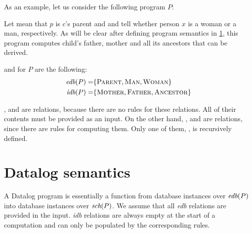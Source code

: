 \begin{exmp}
As an example, let us consider the following program $P$:


Let  mean that $p$ is $c$'s parent and  and  tell whether person $x$ is a woman or a man, respectively. As will be clear after defining program semantics in \ref{ss:datalogsemantics}, this program computes child's father, mother and all its ancestors that can be derived.

\edb and \idb for $P$ are the following:
\begin{align*}
\textit{edb}(P) =& \{\textsc{Parent}, \textsc{Man}, \textsc{Woman}\} \\
\textit{idb}(P) =& \{\textsc{Mother}, \textsc{Father}, \textsc{Ancestor}\}
\end{align*}

,  and  are \edb relations, because there are no rules for these relations. All of their contents must be provided as an input. On the other hand, ,  and  are \idb relations, since there are rules for computing them. Only one of them, , is recursively defined.

\end{exmp}

\section{Datalog semantics}\label{ss:datalogsemantics}
A Datalog program is essentially a function from database instances over $\textit{edb}(P)$ into database instances over $\textit{sch}(P)$. We assume that all \emph{edb} relations are provided in the input. \emph{idb} relations are always empty at the start of a computation and can only be populated by the corresponding rules.

